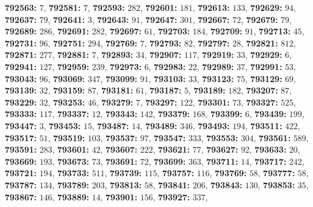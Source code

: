 \textsf{\bfseries 792563:} $7$, \textsf{\bfseries 792581:} $7$, \textsf{\bfseries 792593:} $282$, \textsf{\bfseries 792601:} $181$, \textsf{\bfseries 792613:} $133$, \textsf{\bfseries 792629:} $94$, \textsf{\bfseries 792637:} $79$, \textsf{\bfseries 792641:} $3$, \textsf{\bfseries 792643:} $91$, \textsf{\bfseries 792647:} $301$, \textsf{\bfseries 792667:} $72$, \textsf{\bfseries 792679:} $79$, \textsf{\bfseries 792689:} $286$, \textsf{\bfseries 792691:} $282$, \textsf{\bfseries 792697:} $61$, \textsf{\bfseries 792703:} $184$, \textsf{\bfseries 792709:} $91$, \textsf{\bfseries 792713:} $45$, \textsf{\bfseries 792731:} $96$, \textsf{\bfseries 792751:} $294$, \textsf{\bfseries 792769:} $7$, \textsf{\bfseries 792793:} $82$, \textsf{\bfseries 792797:} $28$, \textsf{\bfseries 792821:} $812$, \textsf{\bfseries 792871:} $277$, \textsf{\bfseries 792881:} $7$, \textsf{\bfseries 792893:} $34$, \textsf{\bfseries 792907:} $117$, \textsf{\bfseries 792919:} $33$, \textsf{\bfseries 792929:} $6$, \textsf{\bfseries 792941:} $127$, \textsf{\bfseries 792959:} $239$, \textsf{\bfseries 792973:} $6$, \textsf{\bfseries 792983:} $22$, \textsf{\bfseries 792989:} $37$, \textsf{\bfseries 792991:} $53$, \textsf{\bfseries 793043:} $96$, \textsf{\bfseries 793069:} $347$, \textsf{\bfseries 793099:} $91$, \textsf{\bfseries 793103:} $33$, \textsf{\bfseries 793123:} $75$, \textsf{\bfseries 793129:} $69$, \textsf{\bfseries 793139:} $32$, \textsf{\bfseries 793159:} $87$, \textsf{\bfseries 793181:} $61$, \textsf{\bfseries 793187:} $5$, \textsf{\bfseries 793189:} $182$, \textsf{\bfseries 793207:} $87$, \textsf{\bfseries 793229:} $32$, \textsf{\bfseries 793253:} $46$, \textsf{\bfseries 793279:} $7$, \textsf{\bfseries 793297:} $122$, \textsf{\bfseries 793301:} $73$, \textsf{\bfseries 793327:} $525$, \textsf{\bfseries 793333:} $117$, \textsf{\bfseries 793337:} $12$, \textsf{\bfseries 793343:} $142$, \textsf{\bfseries 793379:} $168$, \textsf{\bfseries 793399:} $6$, \textsf{\bfseries 793439:} $199$, \textsf{\bfseries 793447:} $3$, \textsf{\bfseries 793453:} $15$, \textsf{\bfseries 793487:} $14$, \textsf{\bfseries 793489:} $346$, \textsf{\bfseries 793493:} $194$, \textsf{\bfseries 793511:} $422$, \textsf{\bfseries 793517:} $51$, \textsf{\bfseries 793519:} $103$, \textsf{\bfseries 793537:} $97$, \textsf{\bfseries 793547:} $333$, \textsf{\bfseries 793553:} $304$, \textsf{\bfseries 793561:} $589$, \textsf{\bfseries 793591:} $283$, \textsf{\bfseries 793601:} $42$, \textsf{\bfseries 793607:} $222$, \textsf{\bfseries 793621:} $77$, \textsf{\bfseries 793627:} $92$, \textsf{\bfseries 793633:} $20$, \textsf{\bfseries 793669:} $193$, \textsf{\bfseries 793673:} $73$, \textsf{\bfseries 793691:} $72$, \textsf{\bfseries 793699:} $363$, \textsf{\bfseries 793711:} $14$, \textsf{\bfseries 793717:} $242$, \textsf{\bfseries 793721:} $194$, \textsf{\bfseries 793733:} $511$, \textsf{\bfseries 793739:} $115$, \textsf{\bfseries 793757:} $116$, \textsf{\bfseries 793769:} $58$, \textsf{\bfseries 793777:} $58$, \textsf{\bfseries 793787:} $134$, \textsf{\bfseries 793789:} $203$, \textsf{\bfseries 793813:} $58$, \textsf{\bfseries 793841:} $206$, \textsf{\bfseries 793843:} $130$, \textsf{\bfseries 793853:} $35$, \textsf{\bfseries 793867:} $146$, \textsf{\bfseries 793889:} $14$, \textsf{\bfseries 793901:} $156$, \textsf{\bfseries 793927:} $337$, 
